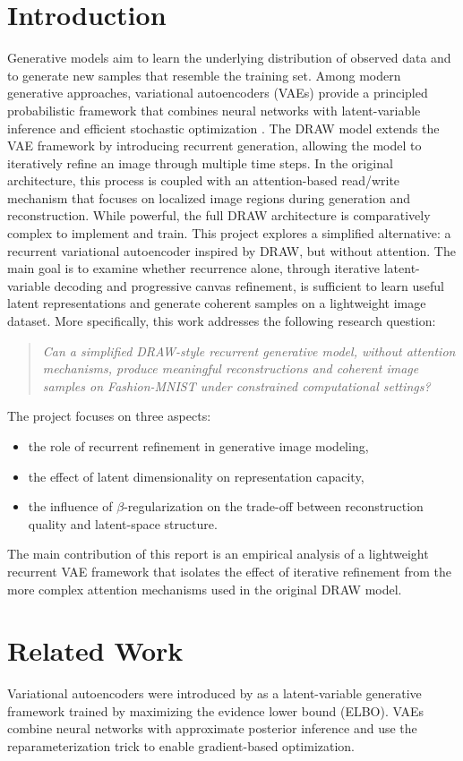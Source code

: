 \documentclass[11pt,a4paper]{article}
\begin{document}
\section{Introduction}
Generative models aim to learn the underlying distribution of observed data and to generate new samples that resemble the training set. Among modern generative approaches, variational autoencoders (VAEs) provide a principled probabilistic framework that combines neural networks with latent-variable inference and efficient stochastic optimization \citep{kingma2014}.
The DRAW model \citep{gregor2015} extends the VAE framework by introducing recurrent generation, allowing the model to iteratively refine an image through multiple time steps. In the original architecture, this process is coupled with an attention-based read/write mechanism that focuses on localized image regions during generation and reconstruction. While powerful, the full DRAW architecture is comparatively complex to implement and train.
This project explores a simplified alternative: a recurrent variational autoencoder inspired by DRAW, but without attention. The main goal is to examine whether recurrence alone, through iterative latent-variable decoding and progressive canvas refinement, is sufficient to learn useful latent representations and generate coherent samples on a lightweight image dataset.
More specifically, this work addresses the following research question:
\begin{quote}
\emph{Can a simplified DRAW-style recurrent generative model, without attention mechanisms, produce meaningful reconstructions and coherent image samples on Fashion-MNIST under constrained computational settings?}
\end{quote}
The project focuses on three aspects:
\begin{itemize}
    \item the role of recurrent refinement in generative image modeling,
    \item the effect of latent dimensionality on representation capacity,
    \item the influence of $\beta$-regularization on the trade-off between reconstruction quality and latent-space structure.
\end{itemize}
The main contribution of this report is an empirical analysis of a lightweight recurrent VAE framework that isolates the effect of iterative refinement from the more complex attention mechanisms used in the original DRAW model.
\section{Related Work}
Variational autoencoders were introduced by \citet{kingma2014} as a latent-variable generative framework trained by maximizing the evidence lower bound (ELBO). VAEs combine neural networks with approximate posterior inference and use the reparameterization trick to enable gradient-based optimization.
\end{document}
